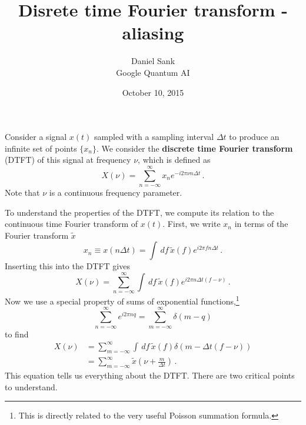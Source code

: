 \documentclass[twocolumn]{article}
\title{Disrete time Fourier transform - aliasing}
\author{Daniel Sank \\ \small{Google Quantum AI}}
\date{October 10, 2015}
\begin{document}
\maketitle

Consider a signal $x(t)$ sampled with a sampling interval $\Delta t$ to produce an infinite set of points $\{ x_n \}$.
We consider the \textbf{discrete time Fourier transform} (DTFT) of this signal at frequency $\nu$, which is defined as
\begin{equation}
X(\nu) =\sum_{n=-\infty}^\infty x_n e^{-i 2\pi \nu n \Delta t} \, .
\end{equation}
Note that $\nu$ is a continuous frequency parameter.

To understand the properties of the DTFT, we compute its relation to the continuous time Fourier transform of $x(t)$.
First, we write $x_n$ in terms of the Fourier transform $\tilde{x}$
\begin{equation}
x_n \equiv x(n \Delta t) = \int \, df \, \tilde{x}(f) e^{i 2 \pi f n \Delta t} \, .
\end{equation}
Inserting this into the DTFT gives
\begin{equation}
X(\nu) = \sum_{n=-\infty}^\infty \int \, df \,
\tilde{x}(f) e^{i 2 \pi n \Delta t (f - \nu)} \, .
\end{equation}
Now we use a special property of sums of exponential functions,\footnote{This is directly related to the very useful Poisson summation formula.}
\begin{equation}
\sum_{n=-\infty}^\infty e^{i 2 \pi n q} =
\sum_{m=-\infty}^\infty \delta (m - q)
\end{equation}
to find
\begin{align}
X(\nu)
&= \sum_{m=-\infty}^\infty \int \, df \, \tilde{x}(f) \delta( m - \Delta t (f - \nu) ) \nonumber \\
&= \sum_{m=-\infty}^\infty \tilde{x} \left( \nu + \frac{m}{\Delta t} \right) \, .
\end{align}
This equation tells us everything about the DTFT.
There are two critical points to understand.
\end{document}

